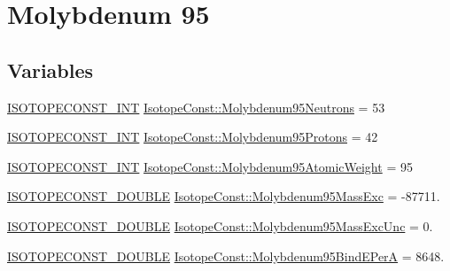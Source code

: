 \hypertarget{group___isotope_const-_molybdenum-_mo95}{}\section{Molybdenum 95}
\label{group___isotope_const-_molybdenum-_mo95}
\subsection*{Variables}
\begin{DoxyCompactItemize}
\item 
\mbox{\hyperlink{group___isotope_const-_macros_ga5f18360b3e99483a35c32d789e62621c}{I\+S\+O\+T\+O\+P\+E\+C\+O\+N\+S\+T\+\_\+\+I\+NT}} \mbox{\hyperlink{group___isotope_const-_molybdenum-_mo95_gad40c3059d6fc7fb50127155bd7d65b71}{Isotope\+Const\+::\+Molybdenum95\+Neutrons}} = 53
\item 
\mbox{\hyperlink{group___isotope_const-_macros_ga5f18360b3e99483a35c32d789e62621c}{I\+S\+O\+T\+O\+P\+E\+C\+O\+N\+S\+T\+\_\+\+I\+NT}} \mbox{\hyperlink{group___isotope_const-_molybdenum-_mo95_gac4b55c721c081fa4160c7ed6c44eab35}{Isotope\+Const\+::\+Molybdenum95\+Protons}} = 42
\item 
\mbox{\hyperlink{group___isotope_const-_macros_ga5f18360b3e99483a35c32d789e62621c}{I\+S\+O\+T\+O\+P\+E\+C\+O\+N\+S\+T\+\_\+\+I\+NT}} \mbox{\hyperlink{group___isotope_const-_molybdenum-_mo95_ga14f165abf8d85076ddf4bbf37f0f3785}{Isotope\+Const\+::\+Molybdenum95\+Atomic\+Weight}} = 95
\item 
\mbox{\hyperlink{group___isotope_const-_macros_ga8f45a7272ce02c0b4c65c44636ed719a}{I\+S\+O\+T\+O\+P\+E\+C\+O\+N\+S\+T\+\_\+\+D\+O\+U\+B\+LE}} \mbox{\hyperlink{group___isotope_const-_molybdenum-_mo95_ga654db3613f1bb1b5b3094287f0e776a0}{Isotope\+Const\+::\+Molybdenum95\+Mass\+Exc}} = -\/87711.
\item 
\mbox{\hyperlink{group___isotope_const-_macros_ga8f45a7272ce02c0b4c65c44636ed719a}{I\+S\+O\+T\+O\+P\+E\+C\+O\+N\+S\+T\+\_\+\+D\+O\+U\+B\+LE}} \mbox{\hyperlink{group___isotope_const-_molybdenum-_mo95_ga4d4376796a23e1d6599a68e6fd516b23}{Isotope\+Const\+::\+Molybdenum95\+Mass\+Exc\+Unc}} = 0.
\item 
\mbox{\hyperlink{group___isotope_const-_macros_ga8f45a7272ce02c0b4c65c44636ed719a}{I\+S\+O\+T\+O\+P\+E\+C\+O\+N\+S\+T\+\_\+\+D\+O\+U\+B\+LE}} \mbox{\hyperlink{group___isotope_const-_molybdenum-_mo95_gaf91d246e32c41f7f11be822b1a9028c1}{Isotope\+Const\+::\+Molybdenum95\+Bind\+E\+PerA}} = 8648.
\item 

\end{DoxyCompactItemize}
